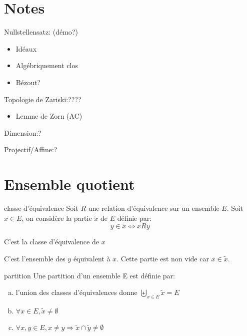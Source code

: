 \section{Notes}

Nullstellensatz: (démo?)
\begin{itemize}
    \item Idéaux
    \item Algébriquement clos
    \item Bézout?
\end{itemize}
\mbox{}

Topologie de Zariski:????
\begin{itemize}
    \item Lemme de Zorn (AC)
\end{itemize}
\mbox{}

Dimension:?
\mbox{}

Projectif/Affine:?
\mbox{}





\section{Ensemble quotient}

\begin{definition}{classe d'équivalence}{}
    Soit $R$ une relation d'équivalence sur un ensemble $E$.
    Soit $x \in E$, on considère la partie $\tilde{x}$ de $E$ définie par:
    \[ y \in \tilde{x} \Leftrightarrow x R y \]

    \noindent
    C'est la classe d'équivalence de $x$
\end{definition}

C'est l'ensemble des $y$ équivalent à $x$. Cette partie est non vide car $x \in \tilde{x}$.

\begin{definition}{partition}{}
    Une partition d'un ensemble E est définie par:
    \begin{enumerate}[(a)]
        \item l'union des classes d'équivalences donne $\displaystyle \biguplus_{x \in E} \tilde{x} = E$
        \item $\forall x \in E, \tilde{x} \neq \emptyset$
        \item $\forall x, y \in E, x \neq y \Rightarrow \tilde{x} \cap \tilde{y} \neq \emptyset$
    \end{enumerate}
\end{definition}

